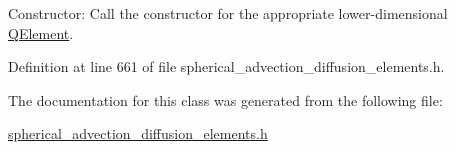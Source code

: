 Constructor\+: Call the constructor for the appropriate lower-\/dimensional \hyperlink{classoomph_1_1QElement}{Q\+Element}. 



Definition at line 661 of file spherical\+\_\+advection\+\_\+diffusion\+\_\+elements.\+h.



The documentation for this class was generated from the following file\+:\begin{DoxyCompactItemize}
\item 
\hyperlink{spherical__advection__diffusion__elements_8h}{spherical\+\_\+advection\+\_\+diffusion\+\_\+elements.\+h}\end{DoxyCompactItemize}
